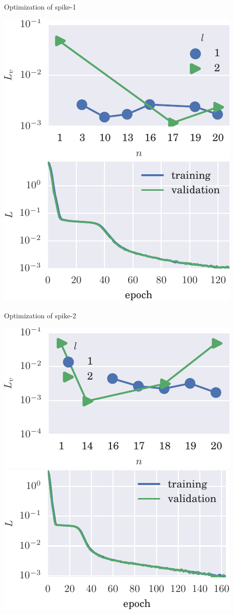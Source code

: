 \documentclass{beamer}
\begin{document}
    
    \begin{frame}{Optimization of spike-1}

      \includegraphics[width=.5\textwidth]{figs/bo_spikelv.pdf}
      \includegraphics[width=.5\textwidth]{figs/trn_spikelv.pdf}
      
    \end{frame}


    \begin{frame}{Optimization of spike-2}

      \includegraphics[width=.5\textwidth]{figs/bo_spikereg.pdf}
      \includegraphics[width=.5\textwidth]{figs/trn_spikereg.pdf}
      
    \end{frame}
\end{document}
